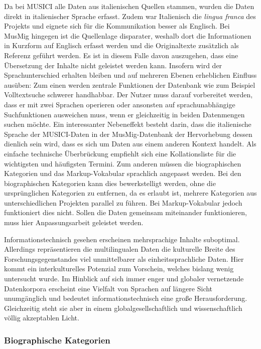 \documentclass[a4paper,
fontsize=11pt,
oneside,
numbers=noperiodatend,
parskip=half-,
bibliography=totoc,
final
]{scrartcl}
\begin{document}
Da bei MUSICI alle Daten aus italienischen Quellen stammen, wurden die
Daten direkt in italienischer Sprache erfasst. Zudem war Italienisch die
\emph{lingua franca} des Projekts und eignete sich für die Kommunikation
besser als Englisch. Bei MusMig hingegen ist die Quellenlage disparater,
weshalb dort die Informationen in Kurzform auf Englisch erfasst werden
und die Originaltexte zusätzlich als Referenz geführt werden. Es ist in
diesem Falle davon auszugehen, dass eine Übersetzung der Inhalte nicht
geleistet werden kann. Insofern wird der Sprachunterschied erhalten
bleiben und auf mehreren Ebenen erheblichen Einfluss ausüben: Zum einen
werden zentrale Funktionen der Datenbank wie zum Beispiel Volltextsuche
schwerer handhabbar. Der Nutzer muss darauf vorbereitet werden, dass er
mit zwei Sprachen operieren oder ansonsten auf sprachunabhängige
Suchfunktionen ausweichen muss, wenn er gleichzeitig in beiden
Datenmengen suchen möchte. Ein interessanter Nebeneffekt besteht darin,
dass die italienische Sprache der MUSICI-Daten in der MusMig-Datenbank
der Hervorhebung dessen dienlich sein wird, dass es sich um Daten aus
einem anderen Kontext handelt. Als einfache technische Überbrückung
empfiehlt sich eine Kollationsliste für die wichtigsten und häufigsten
Termini. Zum anderen müssen die biographischen Kategorien und das
Markup-Vokabular sprachlich angepasst werden. Bei den biographischen
Kategorien kann dies bewerkstelligt werden, ohne die ursprünglichen
Kategorien zu entfernen, da es erlaubt ist, mehrere Kategorien aus
unterschiedlichen Projekten parallel zu führen. Bei Markup-Vokabular
jedoch funktioniert dies nicht. Sollen die Daten gemeinsam miteinander
funktionieren, muss hier Anpassungsarbeit geleistet werden.

Informationstechnisch gesehen erscheinen mehrsprachige Inhalte
suboptimal. Allerdings repräsentieren die multilingualen Daten die
kulturelle Breite des Forschungsgegenstandes viel unmittelbarer als
einheitssprachliche Daten. Hier kommt ein interkulturelles Potenzial zum
Vorschein, welches bislang wenig untersucht wurde. Im Hinblick auf sich
immer enger und globaler vernetzende Datenkorpora erscheint eine
Vielfalt von Sprachen auf längere Sicht unumgänglich und bedeutet
informationstechnisch eine große Herausforderung. Gleichzeitig steht sie
aber in einem globalgesellschaftlich und wissenschaftlich völlig
akzeptablen Licht.

\subsubsection*{Biographische Kategorien}\label{biographische-kategorien}
\end{document}
